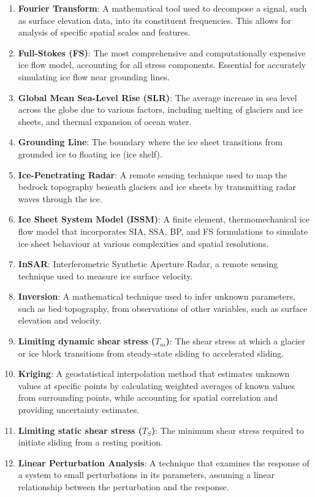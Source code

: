 \begin{enumerate}
\item \textbf{Fourier Transform}: A mathematical tool used to decompose a signal, such as surface elevation data, into its constituent frequencies. This allows for analysis of specific spatial scales and features.
\item \textbf{Full-Stokes (FS)}: The most comprehensive and computationally expensive ice flow model, accounting for all stress components. Essential for accurately simulating ice flow near grounding lines.
\item \textbf{Global Mean Sea-Level Rise (SLR)}: The average increase in sea level across the globe due to various factors, including melting of glaciers and ice sheets, and thermal expansion of ocean water.
\item \textbf{Grounding Line}: The boundary where the ice sheet transitions from grounded ice to floating ice (ice shelf).
\item \textbf{Ice-Penetrating Radar}: A remote sensing technique used to map the bedrock topography beneath glaciers and ice sheets by transmitting radar waves through the ice.
\item \textbf{Ice Sheet System Model (ISSM)}: A finite element, thermomechanical ice flow model that incorporates SIA, SSA, BP, and FS formulations to simulate ice sheet behaviour at various complexities and spatial resolutions.
\item \textbf{InSAR}: Interferometric Synthetic Aperture Radar, a remote sensing technique used to measure ice surface velocity.
\item \textbf{Inversion}: A mathematical technique used to infer unknown parameters, such as bed topography, from observations of other variables, such as surface elevation and velocity.
\item \textbf{Limiting dynamic shear stress ($T_m$)}: The shear stress at which a glacier or ice block transitions from steady-state sliding to accelerated sliding.
\item \textbf{Kriging}: A geostatistical interpolation method that estimates unknown values at specific points by calculating weighted averages of known values from surrounding points, while accounting for spatial correlation and providing uncertainty estimates.
\item \textbf{Limiting static shear stress ($T_S$)}: The minimum shear stress required to initiate sliding from a resting position.
\item \textbf{Linear Perturbation Analysis}: A technique that examines the response of a system to small perturbations in its parameters, assuming a linear relationship between the perturbation and the response.

\end{enumerate}
